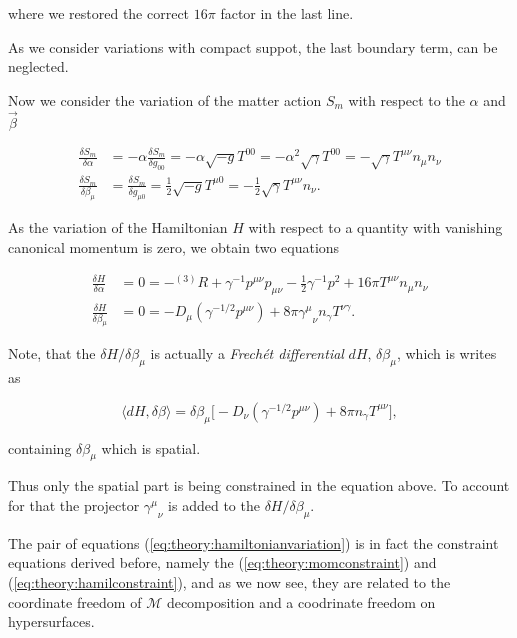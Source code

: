 {    where we restored the correct $16\pi$ factor in the last line.
    
    As we consider variations with compact suppot, the last boundary term, can be neglected.
    
    
    Now we consider the variation of the matter action $S_m$ with respect to the $\alpha$ and $\vec{\beta}$
    
    \begin{align}
        \frac{\delta S_m}{\delta \alpha} &=-\alpha\frac{\delta S_m}{\delta g_{00}} = -\alpha\sqrt{-g}T^{00} = -\alpha^2\sqrt{\gamma}T^{00} = -\sqrt{\gamma}T^{\mu\nu}n_{\mu}n_{\nu} \\
        \frac{\delta S_m}{\delta \beta_{\mu}} &= \frac{\delta S_m}{\delta g_{\mu 0}} =\frac{1}{2}\sqrt{-g}T^{\mu 0} = -\frac{1}{2} \sqrt{\gamma}T^{\mu\nu}n_{\nu}.
    \end{align}
    
    As the variation of the Hamiltonian $H$ with respect to a quantity with vanishing canonical momentum is zero, we obtain two equations 
    
    \begin{align}
        \frac{\delta H}{\delta \alpha} &= 0 = -{^{(3)}R} + \gamma^{-1}p^{\mu\nu}p_{\mu\nu}-\frac{1}{2}\gamma^{-1}p^2 + 16\pi T^{\mu\nu}n_{\mu}n_{\nu} \\
        \frac{\delta H}{\delta \beta_{\mu}} &= 0 = - D_{\mu}(\gamma^{-1/2}p^{\mu\nu}) + 8\pi{\gamma^{\mu}}_{\nu}n_{\gamma}T^{\nu\gamma}.
    \label{eq:theory:hamiltonianvariation}
    \end{align}
    
    Note, that the $\delta H / \delta\beta_{\mu}$ is actually a \textit{Frech\'et differential} $dH$, $\delta \beta_{\mu}$, which is writes as
    
    \begin{equation}
        \langle dH,\delta\beta \rangle = \delta\beta_{\mu}\big[-D_{\nu}(\gamma^{-1/2}p^{\mu\nu})+8\pi n_{\gamma}T^{\mu\nu}\big], 
    \end{equation}
    
    containing $\delta\beta_{\mu}$ which is spatial. 
    
    Thus only the spatial part is being constrained in the equation above. 
    To account for that the projector ${\gamma^{\mu}}_{\nu}$ is added to the $\delta H/\delta \beta_{\mu}$.
    
    The pair of equations (\ref{eq:theory:hamiltonianvariation}) is in fact the constraint equations derived before, namely the (\ref{eq:theory:momconstraint}) and (\ref{eq:theory:hamilconstraint}), and as we now see, they are related to the coordinate freedom of $\mathcal{M}$ decomposition and a coodrinate freedom on hypersurfaces.
    
}
